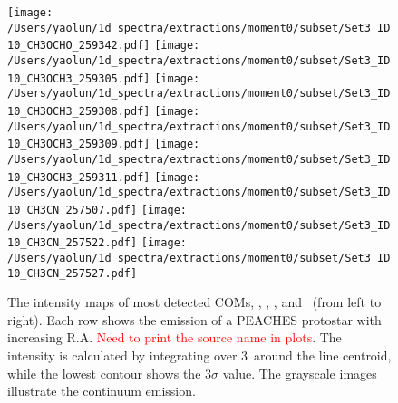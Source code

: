 \begin{figure*}[htbp!]
  \texttt{[image: /Users/yaolun/1d\_spectra/extractions/moment0/subset/Set3\_ID10\_CH3OCHO\_259342.pdf]}
  \texttt{[image: /Users/yaolun/1d\_spectra/extractions/moment0/subset/Set3\_ID10\_CH3OCH3\_259305.pdf]}
  \texttt{[image: /Users/yaolun/1d\_spectra/extractions/moment0/subset/Set3\_ID10\_CH3OCH3\_259308.pdf]}
  \texttt{[image: /Users/yaolun/1d\_spectra/extractions/moment0/subset/Set3\_ID10\_CH3OCH3\_259309.pdf]}
  \texttt{[image: /Users/yaolun/1d\_spectra/extractions/moment0/subset/Set3\_ID10\_CH3OCH3\_259311.pdf]}
  \texttt{[image: /Users/yaolun/1d\_spectra/extractions/moment0/subset/Set3\_ID10\_CH3CN\_257507.pdf]}
  \texttt{[image: /Users/yaolun/1d\_spectra/extractions/moment0/subset/Set3\_ID10\_CH3CN\_257522.pdf]}
  \texttt{[image: /Users/yaolun/1d\_spectra/extractions/moment0/subset/Set3\_ID10\_CH3CN\_257527.pdf]}
  \\
  \caption{The intensity maps of most detected COMs, \methanol, \methylcyanide, \methylformate, and \dimethylether\ (from left to right).  
  Each row shows the emission of a PEACHES protostar with increasing R.A. \textcolor{red}{Need to print the source name in plots}.
  The intensity is calculated by integrating over 3\kms\ around the line centroid, while the lowest contour shows the 3$\sigma$ value.  
  The grayscale images illustrate the continuum emission.}
  \label{fig:coms_map_all}
\end{figure*}